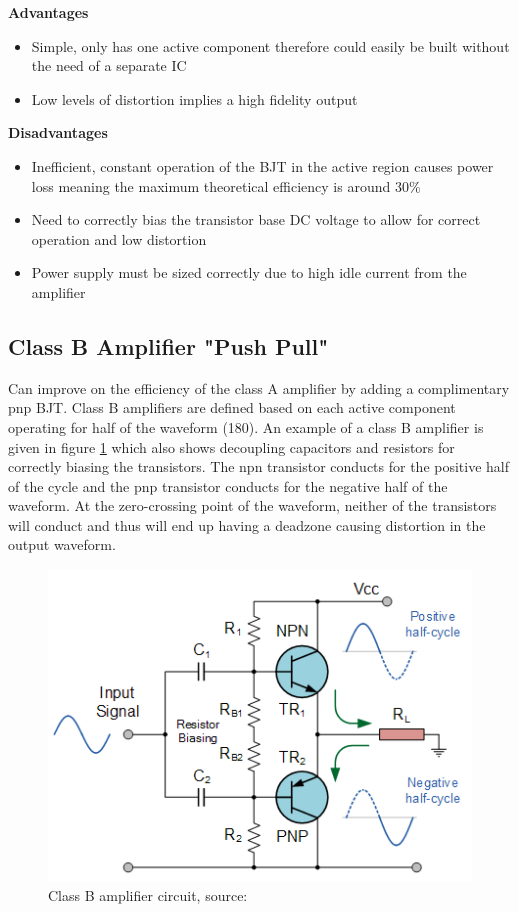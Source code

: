 \documentclass[12pt, a4paper]{article}
\begin{document}
	\textbf{Advantages}
	\begin{itemize}
		\item Simple, only has one active component therefore could easily be built without the need of a separate IC
		\item Low levels of distortion implies a high fidelity output
	\end{itemize}
	\textbf{Disadvantages}
	\begin{itemize}
		\item Inefficient, constant operation of the BJT in the active region causes power loss meaning the maximum theoretical efficiency is around 30\% 
		\item Need to correctly bias the transistor base DC voltage to allow for correct operation and low distortion
		\item Power supply must be sized correctly due to high idle current from the amplifier
	\end{itemize}
	\subsection{Class B Amplifier "Push Pull"}
	Can improve on the efficiency of the class A amplifier by adding a complimentary pnp BJT. Class B amplifiers are defined based on each active component operating for half of the waveform (180\degree).  An example of a class B amplifier is given in figure \ref{fig:classBAmplifier} which also shows decoupling capacitors and resistors for correctly biasing the transistors. The npn transistor conducts for the positive half of the cycle and the pnp transistor conducts for the negative half of the waveform. At the zero-crossing point of the waveform, neither of the transistors will conduct and thus will end up having a deadzone causing distortion in the output waveform. 
	\begin{figure} [!htb]
		\hfill\includegraphics{./Figures/class_B_amplifier_biasing}\hspace*{\fill}	
		\caption{Class B amplifier circuit, source: \cite{amplifiers}}
		\label{fig:classBAmplifier}
	\end{figure}
\end{document}

